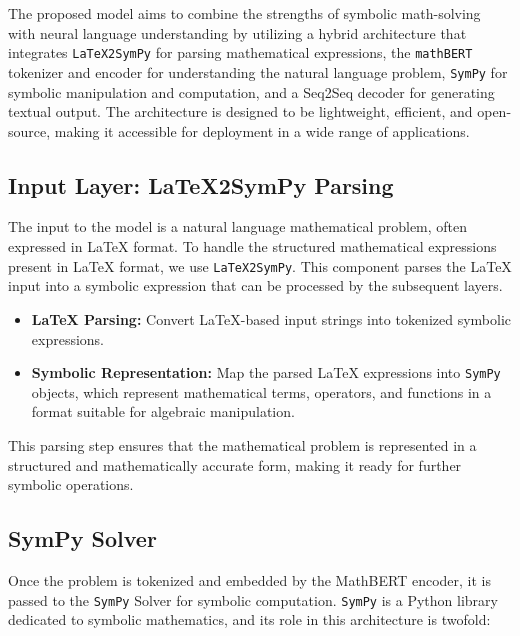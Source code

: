 \documentclass{article}
\begin{document}
The proposed model aims to combine the strengths of symbolic math-solving with neural language understanding by utilizing a hybrid architecture that integrates \texttt{LaTeX2SymPy} for parsing mathematical expressions, the \texttt{mathBERT} tokenizer and encoder for understanding the natural language problem, \texttt{SymPy} for symbolic manipulation and computation, and a Seq2Seq decoder for generating textual output. The architecture is designed to be lightweight, efficient, and open-source, making it accessible for deployment in a wide range of applications.

\subsection{Input Layer: LaTeX2SymPy Parsing}

The input to the model is a natural language mathematical problem, often expressed in LaTeX format. To handle the structured mathematical expressions present in LaTeX format, we use \texttt{LaTeX2SymPy}. This component parses the LaTeX input into a symbolic expression that can be processed by the subsequent layers.

\begin{itemize}
    \item \textbf{LaTeX Parsing:} Convert LaTeX-based input strings into tokenized symbolic expressions.
    \item \textbf{Symbolic Representation:} Map the parsed LaTeX expressions into \texttt{SymPy} objects, which represent mathematical terms, operators, and functions in a format suitable for algebraic manipulation.
\end{itemize}

This parsing step ensures that the mathematical problem is represented in a structured and mathematically accurate form, making it ready for further symbolic operations.

\subsection{SymPy Solver}

Once the problem is tokenized and embedded by the MathBERT encoder, it is passed to the \texttt{SymPy} Solver for symbolic computation. \texttt{SymPy} is a Python library dedicated to symbolic mathematics, and its role in this architecture is twofold:
\end{document}

